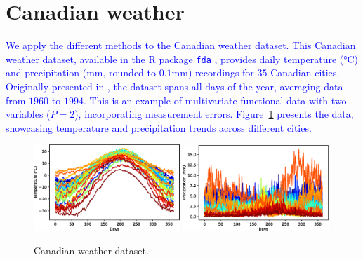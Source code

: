 
\section{Canadian weather} %
\label{sec:canadian_weather}


\textcolor{blue}{We apply the different methods to the Canadian weather dataset. This Canadian weather dataset, available in the R package \texttt{fda} \cite{ramsayFdaFunctionalData2023}, provides daily temperature (°C) and precipitation (mm, rounded to $0.1$mm) recordings for $35$ Canadian cities. Originally presented in \cite{ramsayFunctionalDataAnalysis2005}, the dataset spans all days of the year, averaging data from $1960$ to $1994$. This is an example of multivariate functional data with two variables ($P = 2$), incorporating measurement errors. Figure~\ref{fig:canadian_weather} presents the data, showcasing temperature and precipitation trends across different cities.}
\begin{figure}
    \centering
    \includegraphics[width=0.49\textwidth]{temperature.eps}
    \includegraphics[width=0.49\textwidth]{precipitation.eps}
    \caption{Canadian weather dataset.}
    \label{fig:canadian_weather}
\end{figure}

